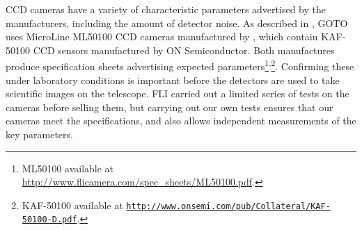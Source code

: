 \begin{colsection}

CCD cameras have a variety of characteristic parameters advertised by the manufacturers, including the amount of detector noise. As described in , GOTO uses MicroLine ML50100 CCD cameras manufactured by , which contain KAF-50100 CCD sensors manufactured by ON Semiconductor. Both manufactures produce specification sheets advertising expected parameters\footnote{ML50100 available at \url{http://www.flicamera.com/spec_sheets/ML50100.pdf}.}\textsuperscript{,}\footnote{KAF-50100 available at \href{http://www.onsemi.com/pub/Collateral/KAF-50100-D.PDF}{\texttt{http://www.onsemi.com/pub/Collateral/KAF-50100-D.pdf}}.}. Confirming these under laboratory conditions is important before the detectors are used to take scientific images on the telescope. FLI carried out a limited series of tests on the cameras before selling them, but carrying out our own tests ensures that our cameras meet the specifications, and also allows independent measurements of the key parameters.

\end{colsection}


